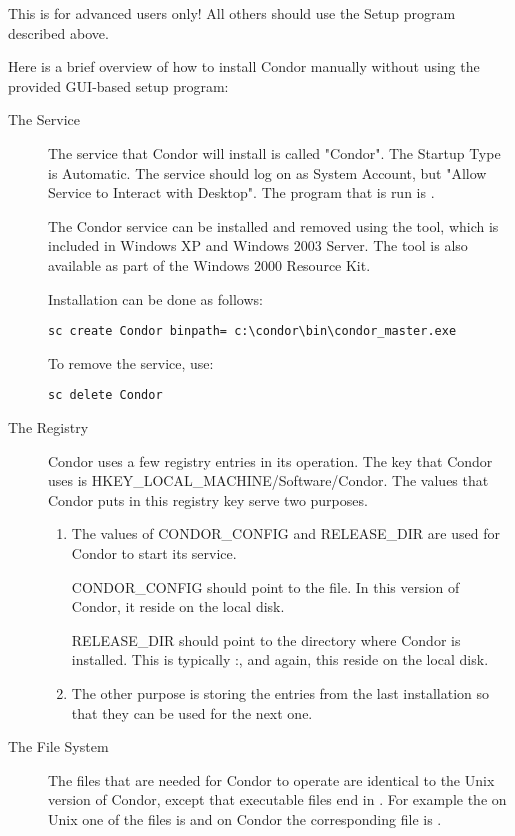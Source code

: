 \Warn This is for advanced users only!  All others should use the Setup program described above. 

Here is a brief overview of how to install Condor manually without using the provided GUI-based setup program:

\begin{description}
\item [The Service]
The service that Condor will install is called "Condor".  The Startup
Type is Automatic.  The service should log on as System Account, but
 "Allow Service to Interact with Desktop".  The
program that is run is .

The Condor service can be installed and removed using the
 tool, which is included in Windows XP and Windows 2003
Server. The tool is also available as part of the Windows 2000
Resource Kit.

Installation can be done as follows:
\begin{verbatim}
sc create Condor binpath= c:\condor\bin\condor_master.exe
\end{verbatim}

To remove the service, use:
\begin{verbatim}
sc delete Condor
\end{verbatim}

\item [The Registry]
Condor uses a few registry entries in its operation.  The key that Condor
uses is HKEY\_LOCAL\_MACHINE/Software/Condor.  The values that Condor puts
in this registry key serve two purposes.
\begin{enumerate}
\item The values of CONDOR\_CONFIG and RELEASE\_DIR are used for Condor
to start its service.

CONDOR\_CONFIG should point to the  file.  In this version
of Condor, it  reside on the local disk.

RELEASE\_DIR should point to the directory where Condor is installed.  This
is typically
\verb@C:\Condor@, and again, this  reside on the
local disk.

\item The other purpose is storing the entries from the last installation
so that they can be used for the next one.
\end{enumerate}

\item [The File System]
The files that are needed for Condor to operate are identical to the Unix
version of Condor, except that executable files end in .  For
example the on Unix one of the files is  and on Condor
the corresponding file is .


\end{description}
